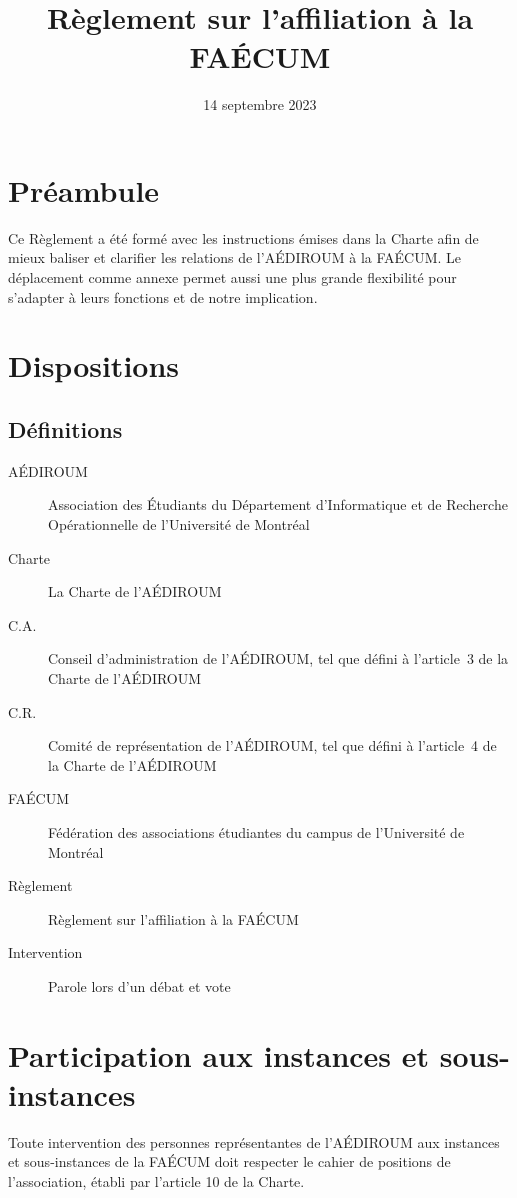 \documentclass{aediroum}
\title{Règlement sur l'affiliation à la FAÉCUM}
\date{14 septembre 2023}
\begin{document}
\maketitle

\section{Préambule}\label{sec:preambule}
Ce Règlement a été formé avec les instructions émises dans la Charte afin de mieux baliser et clarifier les relations de l'AÉDIROUM à la FAÉCUM. Le déplacement comme annexe permet aussi une plus grande flexibilité pour s'adapter à leurs fonctions et de notre implication.

\section{Dispositions}\label{sec:dispositions}

\subsection{Définitions}\label{sec:definitions}
\begin{description}
	\item[AÉDIROUM] Association des Étudiants du Département d'Informatique et de Recherche Opérationnelle de l'Université de Montréal
	\item[Charte] La Charte de l'AÉDIROUM
	\item[C.A.] Conseil d'administration de l'AÉDIROUM, tel que défini à l'article~3 de la Charte de l'AÉDIROUM
	\item[C.R.] Comité de représentation de l'AÉDIROUM, tel que défini à l'article~4 de la Charte de l'AÉDIROUM
	\item[FAÉCUM] Fédération des associations étudiantes du campus de l'Université de Montréal
	\item[Règlement] Règlement sur l'affiliation à la FAÉCUM
	\item[Intervention] Parole lors d'un débat et vote
\end{description}

\section{Participation aux instances et sous-instances}\label{sec:hierarchie-delegues-faecum}

Toute intervention des personnes représentantes
de l’AÉDIROUM aux instances et sous-instances de la FAÉCUM doit respecter le
cahier de positions de l’association, établi par l’article 10 de la Charte.
\end{document}
